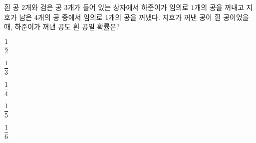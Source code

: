 흰 공 $2$개와 검은 공 $3$개가 들어 있는 상자에서 하준이가 임의로 $1$개의 공을 꺼내고 지호가 남은 $4$개의 공 중에서 임의로 $1$개의 공을 꺼냈다. 지호가 꺼낸 공이 흰 공이었을 때, 하준이가 꺼낸 공도 흰 공일 확률은?
\begin{choices32}{\rule[-3ex]{0pt}{8ex}$\dfrac{1}{2}$}{\rule[-3ex]{0pt}{8ex}$\dfrac{1}{3}$}{\rule[-3ex]{0pt}{8ex}$\dfrac{1}{4}$}{\rule[-3ex]{0pt}{8ex}$\dfrac{1}{5}$}{\rule[-3ex]{0pt}{8ex}$\dfrac{1}{6}$}\end{choices32}
